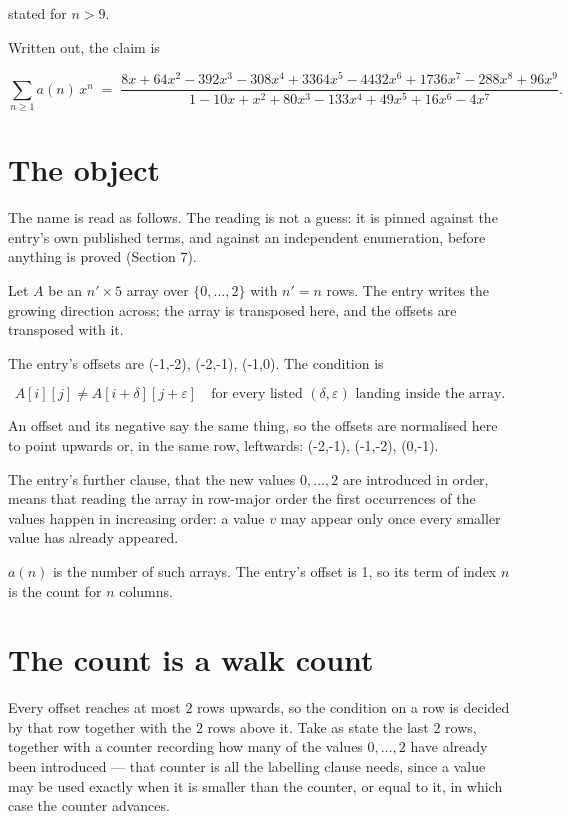 \documentclass[11pt]{article}
\theoremstyle{definition}
\begin{document}
stated for $n > 9$.

Written out, the claim is

\[\sum_{n \ge 1} a(n)\,x^n \;=\; \frac{8x + 64x^{2} - 392x^{3} - 308x^{4} + 3364x^{5} - 4432x^{6} + 1736x^{7} - 288x^{8} + 96x^{9}}{1 - 10x + x^{2} + 80x^{3} - 133x^{4} + 49x^{5} + 16x^{6} - 4x^{7}}.\]

\section{The object}

The name is read as follows. The reading is not a guess: it is pinned against the entry's own published terms, and against an independent enumeration, before anything is proved (Section 7).

Let $A$ be an $n' \times 5$ array over $\{0,\dots,2\}$ with $n' = n$ rows. The entry writes the growing direction across; the array is transposed here, and the offsets are transposed with it.

The entry's offsets are (-1,-2), (-2,-1), (-1,0). The condition is

\[A[i][j] \ne A[i{+}\delta][j{+}\varepsilon]\quad\text{for every listed }(\delta,\varepsilon)\text{ landing inside the array.}\]

An offset and its negative say the same thing, so the offsets are normalised here to point upwards or, in the same row, leftwards: (-2,-1), (-1,-2), (0,-1).

The entry's further clause, that the new values $0,\dots,2$ are introduced in order, means that reading the array in row-major order the first occurrences of the values happen in increasing order: a value $v$ may appear only once every smaller value has already appeared.

$a(n)$ is the number of such arrays. The entry's offset is 1, so its term of index $n$ is the count for $n$ columns.

\section{The count is a walk count}

Every offset reaches at most $2$ rows upwards, so the condition on a row is decided by that row together with the $2$ rows above it. Take as state the last $2$ rows, together with a counter recording how many of the values $0,\dots,2$ have already been introduced --- that counter is all the labelling clause needs, since a value may be used exactly when it is smaller than the counter, or equal to it, in which case the counter advances.
\end{document}
